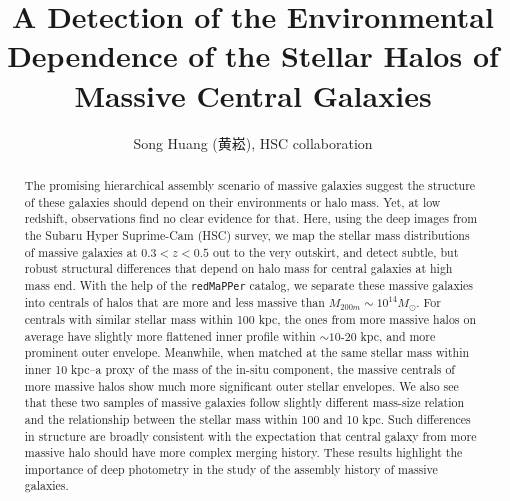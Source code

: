 \documentclass{emulateapj}
\def\redm{\texttt{redMaPPer}}
\newcommand{\todo}[1]{\textcolor{red}{\textbf{TODO:~#1}}}
\begin{document}
\begin{CJK*}{UTF8}{gbsn}


\title{A Detection of the Environmental Dependence of the Stellar Halos of 
       Massive Central Galaxies}


\author{Song Huang (黄崧), 
        HSC collaboration}   
        
        

\date{}                                          



\begin{abstract}
    
    The promising hierarchical assembly scenario of massive galaxies suggest the 
    structure of these galaxies should depend on their environments or halo mass.
    Yet, at low redshift, observations find no clear evidence for that. 
    Here, using the deep images from the Subaru Hyper Suprime-Cam (HSC) survey,
    we map the stellar mass distributions of massive galaxies at $0.3 < z < 0.5$ 
    out to the very outskirt, and detect subtle, but robust structural differences 
    that depend on halo mass for central galaxies at high mass end. 
    With the help of the \redm{} catalog, we separate these massive galaxies 
    into centrals of halos that are more and less massive than 
    $M_{200m}\sim 10^{14} M_{\odot}$.
    For centrals with similar stellar mass within 100 kpc, the ones from 
    more massive halos on average have slightly more flattened inner profile 
    within $\sim 10$-$20$ kpc, and more prominent outer envelope.
    Meanwhile, when matched at the same stellar mass within inner 10 kpc--a 
    proxy of the mass of the in-situ component, the massive centrals of more  
    massive halos show much more significant outer stellar envelopes.    
    We also see that these two samples of massive galaxies follow slightly 
    different mass-size relation and the relationship between the stellar mass 
    within 100 and 10 kpc.
    Such differences in structure are broadly consistent with the expectation that
    central galaxy from more massive halo should have more complex merging history.
    These results highlight the importance of deep photometry in the study of 
    the assembly history of massive galaxies.  


\end{abstract}
\end{CJK*}
\end{document}
